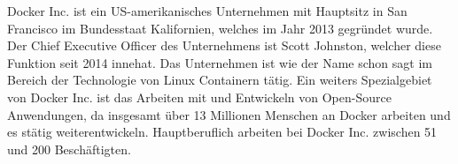
Docker Inc. ist ein US-amerikanisches Unternehmen mit Hauptsitz in San Francisco im Bundesstaat Kalifornien, welches im Jahr 2013 gegründet wurde. Der Chief Executive Officer des Unternehmens ist Scott Johnston, welcher diese Funktion seit 2014 innehat. Das Unternehmen ist wie der Name schon sagt im Bereich der Technologie von Linux Containern tätig. Ein weiters Spezialgebiet von Docker Inc. ist das Arbeiten mit und Entwickeln von Open-Source Anwendungen, da insgesamt über 13 Millionen Menschen an Docker arbeiten und es stätig weiterentwickeln. Hauptberuflich arbeiten bei Docker Inc. zwischen 51 und 200 Beschäftigten. \cite{DockerInc} \cite{Docker}
